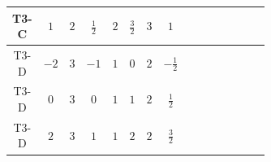 \documentclass[8pt]{article}
\begin{document}
\begin{landscape}
\begin{longtable}{@{}cccccccc >{\raggedright\arraybackslash}p{0.21\linewidth} >{\raggedright\arraybackslash}p{0.21\linewidth} >{\raggedright\arraybackslash}p{0.21\linewidth}@{}}
\midrule
T3-C & $1$ & $2$ & $\frac{1}{2}$ & $2$ & $\frac{3}{2}$ & $3$ & $1$ & \scriptsize\adjustbox{max width=\linewidth}{$\begin{gathered} +D_{\mu _1}\left(S_{2,j_1}\right){}^{\dagger } D_{\mu _1}\left(S_{2,j_1}\right)\end{gathered}$} & \scriptsize\adjustbox{max width=\linewidth}{$\begin{gathered} -\frac{3 \hbar  B_{\mu _1\mu _2}^2}{\epsilon }\end{gathered}$} & \scriptsize\adjustbox{max width=\linewidth}{$\begin{gathered} -\frac{2 \hbar  \left(W_{\mu _1\mu _2}^{A_1}\right){}^2}{\epsilon }\end{gathered}$} \\
\midrule
T3-D & $-2$ & $3$ & $-1$ & $1$ & $0$ & $2$ & $-\frac{1}{2}$ & \scriptsize\adjustbox{max width=\linewidth}{$\begin{gathered} +D_{\mu _1}\left(S_2\right){}^{\dagger } D_{\mu _1}\left(S_2\right)\end{gathered}$} & \scriptsize\adjustbox{max width=\linewidth}{$\begin{gathered} -\frac{\hbar  B_{\mu _1\mu _2}^2}{2 \epsilon }\end{gathered}$} & \scriptsize\adjustbox{max width=\linewidth}{$\begin{gathered} -\frac{\hbar  \left(W_{\mu _1\mu _2}^{A_1}\right){}^2}{2 \epsilon }\end{gathered}$} \\
\midrule
T3-D & $0$ & $3$ & $0$ & $1$ & $1$ & $2$ & $\frac{1}{2}$ & \scriptsize\adjustbox{max width=\linewidth}{$\begin{gathered} +D_{\mu _1}\left(S_2\right){}^{\dagger } D_{\mu _1}\left(S_2\right)\end{gathered}$} & \scriptsize\adjustbox{max width=\linewidth}{$\begin{gathered} -\frac{\hbar  B_{\mu _1\mu _2}^2}{2 \epsilon }\end{gathered}$} & \scriptsize\adjustbox{max width=\linewidth}{$\begin{gathered} -\frac{\hbar  \left(W_{\mu _1\mu _2}^{A_1}\right){}^2}{2 \epsilon }\end{gathered}$} \\
\midrule
T3-D & $2$ & $3$ & $1$ & $1$ & $2$ & $2$ & $\frac{3}{2}$ & \scriptsize\adjustbox{max width=\linewidth}{$\begin{gathered} +D_{\mu _1}\left(S_2\right){}^{\dagger } D_{\mu _1}\left(S_2\right)\end{gathered}$} & \scriptsize\adjustbox{max width=\linewidth}{$\begin{gathered} -\frac{9 \hbar  B_{\mu _1\mu _2}^2}{2 \epsilon }\end{gathered}$} & \scriptsize\adjustbox{max width=\linewidth}{$\begin{gathered} -\frac{\hbar  \left(W_{\mu _1\mu _2}^{A_1}\right){}^2}{2 \epsilon }\end{gathered}$} \\

\end{longtable}
\end{landscape}
\end{document}
